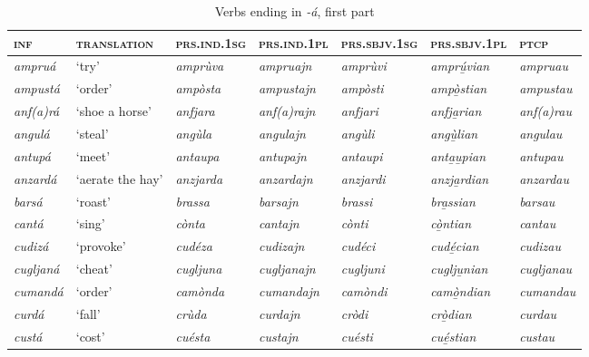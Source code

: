 \begin{sidewaystable} 
	\caption{Verbs ending in \textit{-á}, first part}
	\label{stemalta1}
	\begin{tabularx}{\textwidth}{lllllll} 
		\lsptoprule
		\textsc{\textbf{inf}} & \textsc{\textbf{translation}} & \textsc{\textbf{prs.ind.1sg}} & \textsc{\textbf{prs.ind.1pl}} & \textsc{\textbf{prs.sbjv.1sg}} & \textsc{\textbf{prs.sbjv.1pl}} & \textsc{\textbf{ptcp}} \\
		\midrule
		\textit{ampruá} & `try' & \textit{amprùva} & \textit{ampruajn} &  \textit{amprùvi} & \textit{amprú̱vian} & \textit{ampruau} \\
		\textit{ampustá} & `order' & \textit{ampòsta} & \textit{ampustajn} & \textit{ampòsti} & \textit{ampò̱stian} & \textit{ampustau}\\
		\textit{anf(a)rá} & ‘shoe a horse’ & \textit{anfjara} & \textit{anf(a)rajn} &  \textit{anfjari} & \textit{anfja̱rian} & \textit{anf(a)rau}\\
		\textit{angulá} & `steal' & \textit{angùla} & \textit{angulajn} & \textit{angùli} & \textit{angù̱lian} & \textit{angulau}\\
		\textit{antupá} & `meet' & \textit{antaupa} & \textit{antupajn} & \textit{antaupi} & \textit{anta̱u̱pian} & \textit{antupau}\\
		\textit{anzardá} & `aerate the hay' & \textit{anzjarda} & \textit{anzardajn} & \textit{anzjardi} & \textit{anzja̱rdian} & \textit{anzardau}\\
		\textit{barsá} & ‘roast’ & \textit{brassa} & \textit{barsajn} & \textit{brassi}& \textit{bra̱ssian} & \textit{barsau}\\
		\textit{cantá} & ‘sing’ & \textit{cònta} & \textit{cantajn} & \textit{cònti} & \textit{cò̱ntian} & \textit{cantau}\\
		\textit{cudizá} & ‘provoke’ & \textit{cudéza} & \textit{cudizajn} & \textit{cudéci} & \textit{cudé̱cian} & \textit{cudizau}\\
		\textit{cugljaná} & ‘cheat’ & \textit{cugljuna} & \textit{cugljanajn} & \textit{cugljuni} & \textit{cuglju̱nian} & \textit{cugljanau}\\
		\textit{cumandá} & ‘order’ & \textit{camònda} & \textit{cumandajn} & \textit{camòndi} & \textit{camò̱ndian} & \textit{cumandau}\\
		\textit{curdá} & ‘fall’ & \textit{crùda} & \textit{curdajn} & \textit{cròdi} & \textit{crò̱dian} & \textit{curdau}\\
		\textit{custá} & `cost' & \textit{cuésta} & \textit{custajn} & \textit{cuésti} & \textit{cué̱stian} & \textit{custau}\\

\end{tabularx}
\end{sidewaystable}
